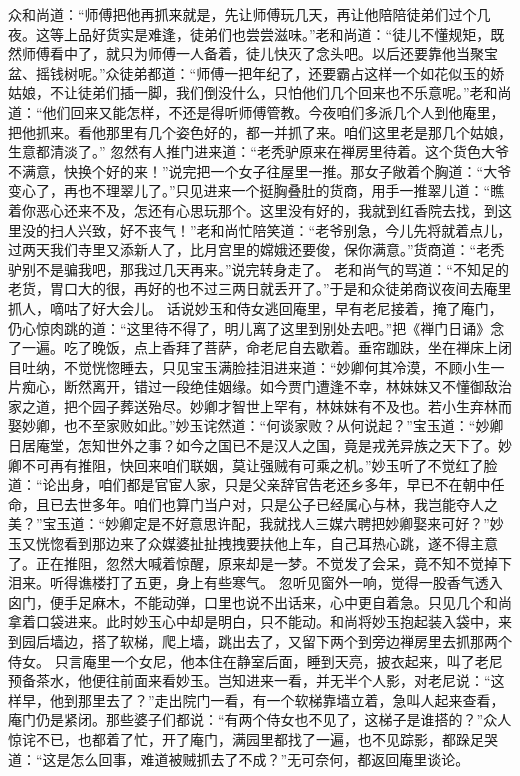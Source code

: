 \documentclass[12pt,oneside]{book}
\begin{document}
众和尚道：“师傅把他再抓来就是，先让师傅玩几天，再让他陪陪徒弟们过个几夜。这等上品好货实是难逢，徒弟们也尝尝滋味。”老和尚道：“徒儿不懂规矩，既然师傅看中了，就只为师傅一人备着，徒儿快灭了念头吧。以后还要靠他当聚宝盆、摇钱树呢。”众徒弟都道：“师傅一把年纪了，还要霸占这样一个如花似玉的娇姑娘，不让徒弟们插一脚，我们倒没什么，只怕他们几个回来也不乐意呢。”老和尚道：“他们回来又能怎样，不还是得听师傅管教。今夜咱们多派几个人到他庵里，把他抓来。看他那里有几个姿色好的，都一并抓了来。咱们这里老是那几个姑娘，生意都清淡了。”
忽然有人推门进来道：“老秃驴原来在禅房里待着。这个货色大爷不满意，快换个好的来！”说完把一个女子往屋里一推。那女子敞着个胸道：“大爷变心了，再也不理翠儿了。”只见进来一个挺胸叠肚的货商，用手一推翠儿道：“瞧着你恶心还来不及，怎还有心思玩那个。这里没有好的，我就到红香院去找，到这里没的扫人兴致，好不丧气！”老和尚忙陪笑道：“老爷别急，今儿先将就着点儿，过两天我们寺里又添新人了，比月宫里的嫦娥还要俊，保你满意。”货商道：“老秃驴别不是骗我吧，那我过几天再来。”说完转身走了。
老和尚气的骂道：“不知足的老货，胃口大的很，再好的也不过三两日就丢开了。”于是和众徒弟商议夜间去庵里抓人，嘀咕了好大会儿。
话说妙玉和侍女逃回庵里，早有老尼接着，掩了庵门，仍心惊肉跳的道：“这里待不得了，明儿离了这里到别处去吧。”把《禅门日诵》念了一遍。吃了晚饭，点上香拜了菩萨，命老尼自去歇着。垂帘跏趺，坐在禅床上闭目吐纳，不觉恍惚睡去，只见宝玉满脸挂泪进来道：“妙卿何其冷漠，不顾小生一片痴心，断然离开，错过一段绝佳姻缘。如今贾门遭逢不幸，林妹妹又不懂御敌治家之道，把个园子葬送殆尽。妙卿才智世上罕有，林妹妹有不及也。若小生弃林而娶妙卿，也不至家败如此。”妙玉诧然道：“何谈家败？从何说起？”宝玉道：“妙卿日居庵堂，怎知世外之事？如今之国已不是汉人之国，竟是戎羌异族之天下了。妙卿不可再有推阻，快回来咱们联姻，莫让强贼有可乘之机。”妙玉听了不觉红了脸道：“论出身，咱们都是官宦人家，只是父亲辞官告老还乡多年，早已不在朝中任命，且已去世多年。咱们也算门当户对，只是公子已经属心与林，我岂能夺人之美？”宝玉道：“妙卿定是不好意思许配，我就找人三媒六聘把妙卿娶来可好？”妙玉又恍惚看到那边来了众媒婆扯扯拽拽要扶他上车，自己耳热心跳，遂不得主意了。正在推阻，忽然大喊着惊醒，原来却是一梦。不觉发了会呆，竟不知不觉掉下泪来。听得谯楼打了五更，身上有些寒气。
忽听见窗外一响，觉得一股香气透入囟门，便手足麻木，不能动弹，口里也说不出话来，心中更自着急。只见几个和尚拿着口袋进来。此时妙玉心中却是明白，只不能动。和尚将妙玉抱起装入袋中，来到园后墙边，搭了软梯，爬上墙，跳出去了，又留下两个到旁边禅房里去抓那两个侍女。
只言庵里一个女尼，他本住在静室后面，睡到天亮，披衣起来，叫了老尼预备茶水，他便往前面来看妙玉。岂知进来一看，并无半个人影，对老尼说：“这样早，他到那里去了？”走出院门一看，有一个软梯靠墙立着，急叫人起来查看，庵门仍是紧闭。那些婆子们都说：“有两个侍女也不见了，这梯子是谁搭的？”众人惊诧不已，也都着了忙，开了庵门，满园里都找了一遍，也不见踪影，都跺足哭道：“这是怎么回事，难道被贼抓去了不成？”无可奈何，都返回庵里谈论。
\end{document}
